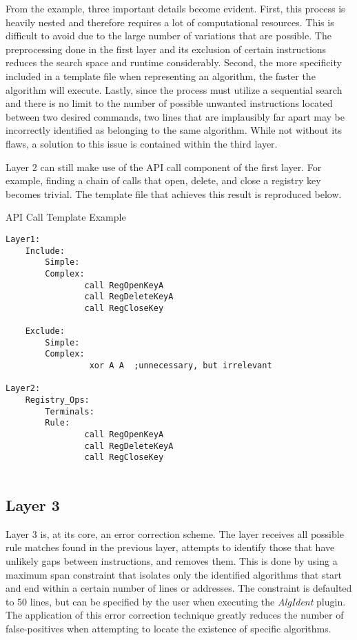\documentclass{article}
\begin{document}
From the example, three important details become evident. First, this process is heavily nested and therefore requires a lot of computational resources.
This is difficult to avoid due to the large number of variations that are possible.  The preprocessing done in the first layer and its exclusion
of certain instructions reduces the search space and runtime considerably.  Second, the more specificity included in a template file when representing an algorithm, 
the faster the algorithm will execute. Lastly, since the process must utilize a sequential search and there is no limit to the number of possible unwanted
instructions located between two desired commands, two lines that are implausibly far apart may be incorrectly identified as belonging to the same algorithm.  While not without its flaws, 
a solution to this issue is contained within the third layer.

Layer 2 can still make use of the API call component of the first layer. For example, finding a chain of calls that open, delete, and close a registry
key becomes trivial.  The template file that achieves this result is reproduced below.

\begin{algorithm}
\lstset{language=[mips]Assembler}
\caption{API Call Template Example}
\begin{lstlisting}
Layer1:
    Include:
        Simple:
        Complex:
                call RegOpenKeyA
                call RegDeleteKeyA
                call RegCloseKey

    Exclude:
        Simple:
        Complex:
                 xor A A  ;unnecessary, but irrelevant

Layer2:
    Registry_Ops:
        Terminals:
        Rule:
                call RegOpenKeyA
                call RegDeleteKeyA
                call RegCloseKey


\end{lstlisting}
\end{algorithm}


\subsection*{Layer 3}
Layer 3 is, at its core, an error correction scheme.  The layer receives all possible rule matches found in the previous layer, attempts to identify those that have
unlikely gaps between instructions, and removes them.  This is done by using a maximum span constraint that isolates only the identified
algorithms that start and end within a certain number of lines or addresses.  The constraint is defaulted to 50 lines, but can be specified by
the user when executing the \emph{AlgIdent} plugin.  The application of this error correction technique greatly reduces the number of false-positives when
attempting to locate the existence of specific algorithms.   
\end{document}
